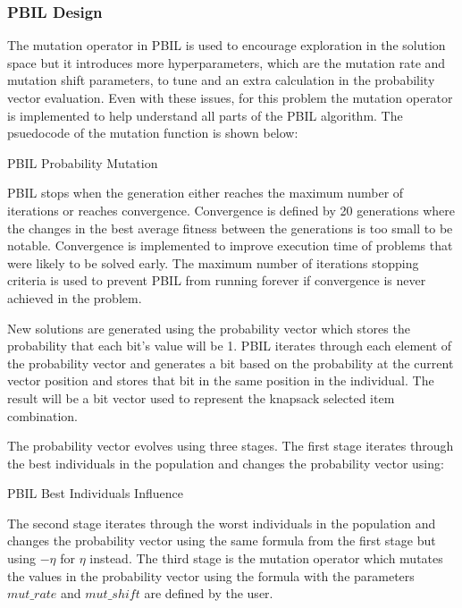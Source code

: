\documentclass{article}
\begin{document}
\subsubsection*{PBIL Design}
The mutation operator in PBIL is used to encourage exploration in the solution space but it introduces more hyperparameters, which are the mutation rate and mutation shift parameters, to tune and an extra calculation in the probability vector evaluation. Even with these issues, for this problem the mutation operator is implemented to help understand all parts of the PBIL algorithm. The psuedocode of the mutation function is shown below: \par
\begin{algorithm}
	\caption{PBIL Probability Mutation}
	\begin{algorithmic}
			\EndIf
		\EndFor
	\end{algorithmic}
\end{algorithm}
\noindent PBIL stops when the generation either reaches the maximum number of iterations or reaches convergence. Convergence is defined by 20 generations where the changes in the best average fitness between the generations is too small to be notable. Convergence is implemented to improve execution time of problems that were likely to be solved early. The maximum number of iterations stopping criteria is used to prevent PBIL from running forever if convergence is never achieved in the problem. \par
\noindent New solutions are generated using the probability vector which stores the probability that each bit’s value will be 1.  PBIL iterates through each element of the probability vector and generates a bit based on the probability at the current vector position and stores that bit in the same position in the individual. The result will be a bit vector used to represent the knapsack selected item combination. \par
\noindent The probability vector evolves using three stages. The first stage iterates through the best individuals in the population and changes the probability vector using: \par 
\begin{algorithm}
	\caption{PBIL Best Individuals Influence}
	\begin{algorithmic}
		\For{$i \gets best\_N $}
			\State{$p \gets p + \eta * (ind_i - p)$}
		\EndFor
	\end{algorithmic}
\end{algorithm}
The second stage iterates through the worst individuals in the population and changes the probability vector using the same formula from the first stage but using $-\eta$ for $\eta$ instead. The third stage is the mutation operator which mutates the values in the probability vector using the formula with the parameters $mut\_rate$ and $mut\_shift$ are defined by the user. \par
\end{document}
